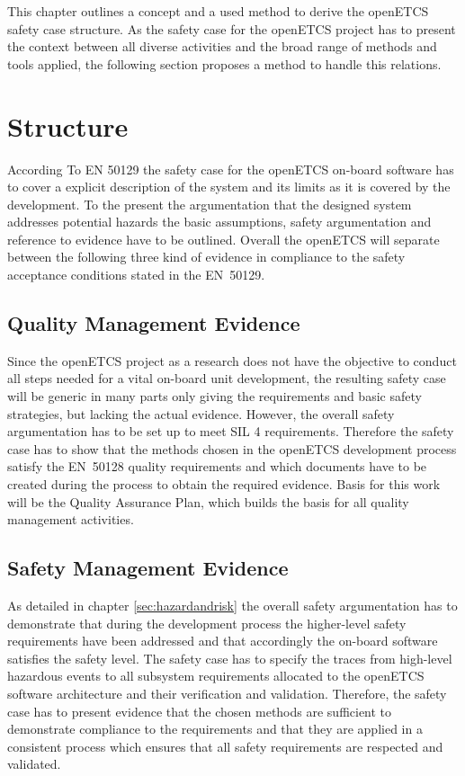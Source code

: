 \documentclass{template/openetcs_report}
\begin{document}
This chapter outlines a concept and a used method to derive the openETCS safety case structure. As the safety case for the openETCS project has to present the context between all diverse activities and the broad range of methods and tools applied, the following section proposes a method to handle this relations.

\section{Structure}
\label{sec:safetycase-structure}

According To EN 50129 the safety case for the openETCS on-board software has to cover a explicit description of the system and its limits as it is covered by the development. To the present the argumentation that the designed system addresses potential hazards the basic assumptions, safety argumentation and reference to evidence have to be outlined.
Overall the openETCS will separate between the following three kind of evidence in compliance to the safety acceptance conditions stated in the EN~50129.

\subsection{Quality Management Evidence}

Since the openETCS project as a research does not have the objective to conduct all steps needed for a vital on-board unit development, the resulting safety case will be generic in many parts only giving the requirements and basic safety strategies, but lacking the actual evidence. However, the overall safety argumentation has to be set up to meet SIL 4 requirements. Therefore the safety case has to show that the methods chosen in the openETCS development process satisfy the EN~50128 quality requirements and which documents have to be created during the process to obtain the required evidence. Basis for this work will be the Quality Assurance Plan, which builds the basis for all quality management activities.

\subsection{Safety Management Evidence}

As detailed in chapter \ref{sec:hazardandrisk} the overall safety argumentation has to demonstrate that during the development process the higher-level safety requirements have been addressed and that accordingly the on-board software satisfies the safety level. The safety case has to specify the traces from high-level hazardous events to all subsystem requirements allocated to the openETCS software architecture and their verification and validation. Therefore, the safety case has to present evidence that the chosen methods are sufficient to demonstrate compliance to the requirements and that they are applied in a consistent process which ensures that all safety requirements are respected and validated.
\end{document}
